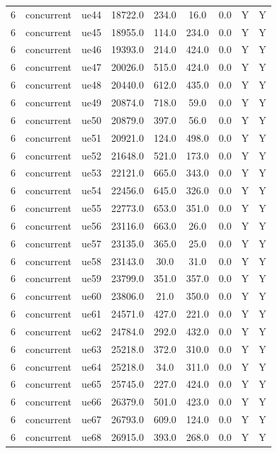 \begin{table}[ht]
\begin{tabular}{|c|c|c|c|c|c|c|c|c|}
6 & concurrent & ue44 & 18722.0 & 234.0 & 16.0 & 0.0 & Y & Y \\
6 & concurrent & ue45 & 18955.0 & 114.0 & 234.0 & 0.0 & Y & Y \\
6 & concurrent & ue46 & 19393.0 & 214.0 & 424.0 & 0.0 & Y & Y \\
6 & concurrent & ue47 & 20026.0 & 515.0 & 424.0 & 0.0 & Y & Y \\
6 & concurrent & ue48 & 20440.0 & 612.0 & 435.0 & 0.0 & Y & Y \\
6 & concurrent & ue49 & 20874.0 & 718.0 & 59.0 & 0.0 & Y & Y \\
6 & concurrent & ue50 & 20879.0 & 397.0 & 56.0 & 0.0 & Y & Y \\
6 & concurrent & ue51 & 20921.0 & 124.0 & 498.0 & 0.0 & Y & Y \\
6 & concurrent & ue52 & 21648.0 & 521.0 & 173.0 & 0.0 & Y & Y \\
6 & concurrent & ue53 & 22121.0 & 665.0 & 343.0 & 0.0 & Y & Y \\
6 & concurrent & ue54 & 22456.0 & 645.0 & 326.0 & 0.0 & Y & Y \\
6 & concurrent & ue55 & 22773.0 & 653.0 & 351.0 & 0.0 & Y & Y \\
6 & concurrent & ue56 & 23116.0 & 663.0 & 26.0 & 0.0 & Y & Y \\
6 & concurrent & ue57 & 23135.0 & 365.0 & 25.0 & 0.0 & Y & Y \\
6 & concurrent & ue58 & 23143.0 & 30.0 & 31.0 & 0.0 & Y & Y \\
6 & concurrent & ue59 & 23799.0 & 351.0 & 357.0 & 0.0 & Y & Y \\
6 & concurrent & ue60 & 23806.0 & 21.0 & 350.0 & 0.0 & Y & Y \\
6 & concurrent & ue61 & 24571.0 & 427.0 & 221.0 & 0.0 & Y & Y \\
6 & concurrent & ue62 & 24784.0 & 292.0 & 432.0 & 0.0 & Y & Y \\
6 & concurrent & ue63 & 25218.0 & 372.0 & 310.0 & 0.0 & Y & Y \\
6 & concurrent & ue64 & 25218.0 & 34.0 & 311.0 & 0.0 & Y & Y \\
6 & concurrent & ue65 & 25745.0 & 227.0 & 424.0 & 0.0 & Y & Y \\
6 & concurrent & ue66 & 26379.0 & 501.0 & 423.0 & 0.0 & Y & Y \\
6 & concurrent & ue67 & 26793.0 & 609.0 & 124.0 & 0.0 & Y & Y \\
6 & concurrent & ue68 & 26915.0 & 393.0 & 268.0 & 0.0 & Y & Y \\

\end{tabular}
\end{table}
